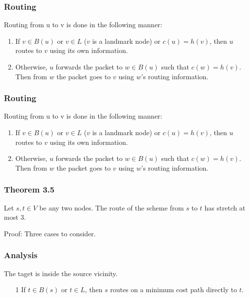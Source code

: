 \documentclass[10pt, compress]{beamer}
\begin{document}
\begin{frame}[fragile]
  \frametitle{Routing}
  \begin{block}{Routing from u to v is done in the following manner:}
    \begin{enumerate}
        \item If $v \in B(u)$ or $v \in L$ ($v$ is a landmark node) or $c(u) =
            h(v)$, then $u$ routes to $v$ using its own information.
        \item Otherwise, $u$ forwards the packet to $w \in B(u)$ such that
            $c(w) = h(v)$. Then from $w$ the packet goes to $v$ using $w$’s
            routing information.
    \end{enumerate}
  \end{block}


\end{frame}


\begin{frame}[fragile]
  \frametitle{Routing}
  \begin{block}{Routing from u to v is done in the following manner:}
    \begin{enumerate}
        \item If $v \in B(u)$ or $v \in L$ ($v$ is a landmark node) or $c(u) =
            h(v)$, then $u$ routes to $v$ using its own information.
        \item Otherwise, $u$ forwards the packet to $w \in B(u)$ such that
            $c(w) = h(v)$. Then from $w$ the packet goes to $v$ using $w$’s
            routing information.
    \end{enumerate}
  \end{block}

\end{frame}


\begin{frame}[fragile]
  \frametitle{Theorem 3.5}
    Let $s,t\in V$ be any two nodes. The route of the scheme from $s$ to $t$ has stretch at most 3.

    Proof: Three cases to consider.
\end{frame}

\begin{frame}[fragile]
  \frametitle{Analysis}
    The taget is inside the source vicinity.
    \begin{enumerate}
        \item[1] If $t\in B(s)$ or $t\in L$, then $s$ routes on a minimum cost path directly to $t$.
    \end{enumerate}
\end{frame}
\end{document}
